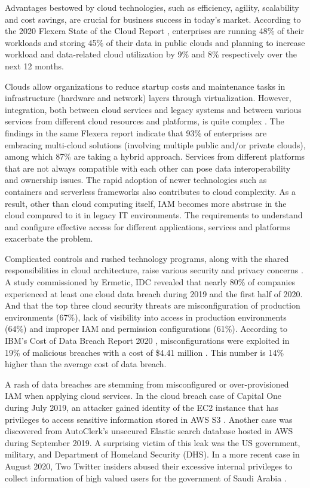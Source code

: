 \documentclass[sigconf]{acmart}
\begin{document}
Advantages bestowed by cloud technologies, such as efficiency, agility, scalability and cost savings, are crucial for business success in today’s market. According to the 2020 Flexera State of the Cloud Report \cite{Flexera2020}, enterprises are running 48\% of their workloads and storing 45\% of their data in public clouds and planning to increase workload and data-related cloud utilization by 9\% and 8\% respectively over the next 12 months. 

Clouds allow organizations to reduce startup costs and maintenance tasks in infrastructure (hardware and network) layers through virtualization. However, integration, both between cloud services and legacy systems and between various services from different cloud resources and platforms, is quite complex \cite{Baron2019}. 
The findings in the same Flexera report \cite{Flexera2020} indicate that 93\% of enterprises are embracing multi-cloud solutions (involving multiple public and/or private clouds), among which 87\% are taking a hybrid approach. Services from different platforms that are not always compatible with each other can pose data interoperability and ownership issues. The rapid adoption of newer technologies such as containers and serverless frameworks also contributes to cloud complexity\cite{Sharrm}. As a result, other than cloud computing itself, IAM becomes more abstruse in the cloud compared to it in legacy IT environments. The requirements to understand and configure effective access for different applications, services and platforms exacerbate the problem. 

Complicated controls and rushed technology programs, along with the shared responsibilities in cloud architecture, raise various security and privacy concerns \cite{Takabi2010}. A study \cite{Ermetic2020} commissioned by Ermetic, IDC revealed that nearly 80\% of companies experienced at least one cloud data breach during 2019 and the first half of 2020. And that the top three cloud security threats are misconfiguration of production environments (67\%), lack of visibility into access in production environments (64\%) and improper IAM and permission configurations (61\%). According to IBM's Cost of Data Breach Report 2020 \cite{IBMSecurity2020}, misconfigurations were exploited in 19\% of malicious breaches with a cost of \$4.41 million . This number is 14\% higher than the average cost of data breach.

A rash of data breaches are stemming from misconfigured or over-provisioned IAM when applying cloud services.
In the cloud breach case of Capital One during July 2019, an attacker gained identity of the EC2 instance that has privileges to access sensitive information stored in AWS S3 \cite{Parimi2019}. 
Another case was discovered from AutoClerk's unsecured Elastic search database hosted in AWS during September 2019. A surprising victim of this leak was the US government, military, and Department of Homeland Security (DHS). \cite{Fawkes2020}
In a more recent case in August 2020, Two Twitter insiders abused their excessive internal privileges to collect information of high valued users for the government of Saudi Arabia \cite{Newman2019}.
\end{document}

